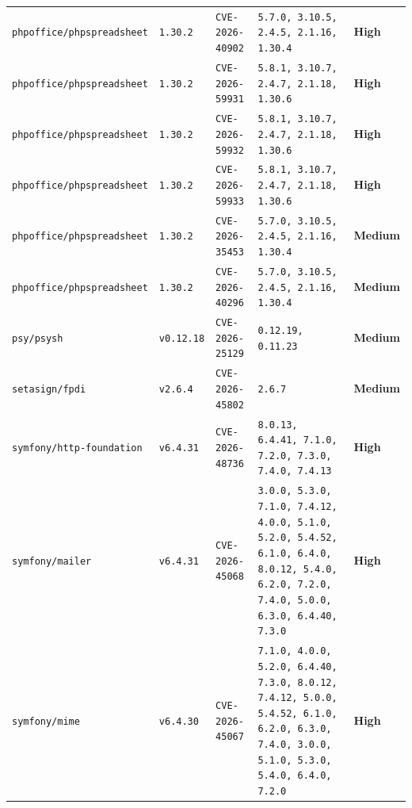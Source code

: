 \documentclass[11pt,a4paper]{article}
\newcommand{\sevbadge}[1]{\textbf{\textcolor{sev#1}{#1}}}
\begin{document}
{\begin{longtable}{@{}>{\raggedright\arraybackslash}p{} l >{\raggedright\arraybackslash}p{} l l@{}}
\texttt{\small phpoffice/\allowbreak{}phpspreadsheet} & \texttt{\small 1.30.2} & \texttt{\small CVE-2026-40902} & \texttt{\small 5.7.0, 3.10.5, 2.4.5, 2.1.16, 1.30.4} & \sevbadge{High}\\
\texttt{\small phpoffice/\allowbreak{}phpspreadsheet} & \texttt{\small 1.30.2} & \texttt{\small CVE-2026-59931} & \texttt{\small 5.8.1, 3.10.7, 2.4.7, 2.1.18, 1.30.6} & \sevbadge{High}\\
\texttt{\small phpoffice/\allowbreak{}phpspreadsheet} & \texttt{\small 1.30.2} & \texttt{\small CVE-2026-59932} & \texttt{\small 5.8.1, 3.10.7, 2.4.7, 2.1.18, 1.30.6} & \sevbadge{High}\\
\texttt{\small phpoffice/\allowbreak{}phpspreadsheet} & \texttt{\small 1.30.2} & \texttt{\small CVE-2026-59933} & \texttt{\small 5.8.1, 3.10.7, 2.4.7, 2.1.18, 1.30.6} & \sevbadge{High}\\
\texttt{\small phpoffice/\allowbreak{}phpspreadsheet} & \texttt{\small 1.30.2} & \texttt{\small CVE-2026-35453} & \texttt{\small 5.7.0, 3.10.5, 2.4.5, 2.1.16, 1.30.4} & \sevbadge{Medium}\\
\texttt{\small phpoffice/\allowbreak{}phpspreadsheet} & \texttt{\small 1.30.2} & \texttt{\small CVE-2026-40296} & \texttt{\small 5.7.0, 3.10.5, 2.4.5, 2.1.16, 1.30.4} & \sevbadge{Medium}\\
\texttt{\small psy/\allowbreak{}psysh} & \texttt{\small v0.12.18} & \texttt{\small CVE-2026-25129} & \texttt{\small 0.12.19, 0.11.23} & \sevbadge{Medium}\\
\texttt{\small setasign/\allowbreak{}fpdi} & \texttt{\small v2.6.4} & \texttt{\small CVE-2026-45802} & \texttt{\small 2.6.7} & \sevbadge{Medium}\\
\texttt{\small symfony/\allowbreak{}http-foundation} & \texttt{\small v6.4.31} & \texttt{\small CVE-2026-48736} & \texttt{\small 8.0.13, 6.4.41, 7.1.0, 7.2.0, 7.3.0, 7.4.0, 7.4.13} & \sevbadge{High}\\
\texttt{\small symfony/\allowbreak{}mailer} & \texttt{\small v6.4.31} & \texttt{\small CVE-2026-45068} & \texttt{\small 3.0.0, 5.3.0, 7.1.0, 7.4.12, 4.0.0, 5.1.0, 5.2.0, 5.4.52, 6.1.0, 6.4.0, 8.0.12, 5.4.0, 6.2.0, 7.2.0, 7.4.0, 5.0.0, 6.3.0, 6.4.40, 7.3.0} & \sevbadge{High}\\
\texttt{\small symfony/\allowbreak{}mime} & \texttt{\small v6.4.30} & \texttt{\small CVE-2026-45067} & \texttt{\small 7.1.0, 4.0.0, 5.2.0, 6.4.40, 7.3.0, 8.0.12, 7.4.12, 5.0.0, 5.4.52, 6.1.0, 6.2.0, 6.3.0, 7.4.0, 3.0.0, 5.1.0, 5.3.0, 5.4.0, 6.4.0, 7.2.0} & \sevbadge{High}\\

\end{longtable}}
\end{document}
